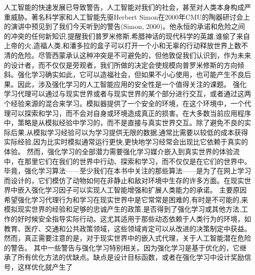 人工智能的快速发展已导致警告，人工智能对我们的社会，甚至对人类本身构成严重威胁。著名科学家和人工智能先驱Herbert Simon在2000年CMU的陶器研讨会上的演讲中预见到了我们今天听到的警告(Simon, 2000)。他永恒的承诺和危险之间的冲突的任何新知识,提醒我们普罗米修斯,希腊神话的现代科学的英雄,谁偷了来自上帝的火,造福人类,和潘多拉的盒子可以打开一个小和无辜的行动释放世界上数不清的危险。尽管西蒙承认这种冲突是不可避免的，但他敦促我们认识到，作为未来的设计者，而不仅仅是旁观者，我们所做的决定会使规模向普罗米修斯的方向倾斜。强化学习确实如此，它可以造福社会，但如果不小心使用，也可能产生不良后果。因此，涉及强化学习的人工智能应用的安全性是一个值得关注的课题。
强化学习代理可以通过与现实世界或者与现实世界的某个部分进行交互，或者通过这两个经验来源的混合来学习。模拟器提供了一个安全的环境，在这个环境中，一个代理可以探索和学习，而不会对自身或环境造成真正的损害。在大多数当前应用程序中，策略是从模拟经验中学习的，而不是直接与真实世界交互。除了避免不良的实际后果,从模拟学习经验可以为学习提供无限的数据,通常比需要以较低的成本获得实际经验,因为比实时模拟通常运行更快,更快地学习经常会出现比它依赖于真实的体验。
然而，强化学习的全部潜力需要强化学习媒介嵌入到真实世界的体验流中，在那里它们在我们的世界中行动、探索和学习，而不仅仅是在它们的世界中。毕竟，强化学习算法——至少我们在本书中关注的那些算法——是为了在网上学习而设计的，它们模仿了动物如何在非静止和敌对环境中生存的许多方面。在现实世界中嵌入强化学习因子可以实现人工智能增强和扩展人类能力的承诺。
主要原因希望强化学习代理行为和学习在现实世界中是它常常是困难的,有时是不可能的,来模拟现实世界的经验和足够的忠诚产生的政策,是否得到了强化学习或其他方法,工作的好时候安全指导实际行动。这尤其适用于那些动态依赖于人类行为的环境，如教育、医疗、交通和公共政策领域，这些领域肯定可以从改进的决策制定中获益。然而，真正需要注意的是，对于现实世界中的嵌入式代理，关于人工智能潜在危险的警告。
其中一些警告与强化学习特别相关。因为强化学习是基于优化的，它继承了所有优化方法的优缺点。缺点是设计目标函数，或者在强化学习中设计奖励信号，这样优化就产生了

